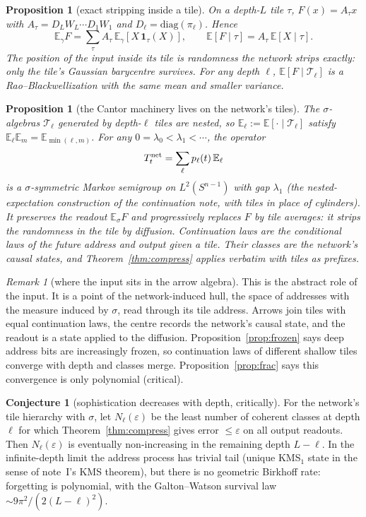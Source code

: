 \documentclass[11pt]{article}
\newtheorem{proposition}[theorem]{Proposition}
\theoremstyle{definition}
\newtheorem{conjecture}[theorem]{Conjecture}
\theoremstyle{remark}
\newtheorem{remark}[theorem]{Remark}
\newcommand{\E}{\mathbb E}
\begin{document}
\begin{proposition}[exact stripping inside a tile]\label{prop:tile}
On a depth-$L$ tile $\tau$, $F(x)=A_\tau x$ with $A_\tau=D_LW_L\cdots D_1W_1$ and $D_\ell=\mathrm{diag}(\pi_\ell)$. Hence
\[\E_\gamma F=\sum_\tau A_\tau\,\E_\gamma[X\,\mathbf 1_\tau(X)],\qquad \E[F\mid\tau]=A_\tau\,\E[X\mid\tau].\]
The position of the input inside its tile is randomness the network strips exactly: only the tile's Gaussian barycentre survives. For any depth $\ell$, $\E[F\mid\mathcal T_\ell]$ is a Rao--Blackwellization with the same mean and smaller variance.
\end{proposition}

\begin{proposition}[the Cantor machinery lives on the network's tiles]\label{prop:nettree}
The $\sigma$-algebras $\mathcal T_\ell$ generated by depth-$\ell$ tiles are nested, so $\E_\ell:=\E[\cdot\mid\mathcal T_\ell]$ satisfy $\E_\ell\E_m=\E_{\min(\ell,m)}$. For any $0=\lambda_0<\lambda_1<\cdots$, the operator
\[T^{\rm net}_t=\sum_\ell p_\ell(t)\,\E_\ell\]
is a $\sigma$-symmetric Markov semigroup on $L^2(S^{n-1})$ with gap $\lambda_1$ (the nested-expectation construction of the continuation note, with tiles in place of cylinders). It preserves the readout $\E_\sigma F$ and progressively replaces $F$ by tile averages: it strips the randomness in the tile by diffusion. Continuation laws are the conditional laws of the future address and output given a tile. Their classes are the network's causal states, and Theorem~\ref{thm:compress} applies verbatim with tiles as prefixes.
\end{proposition}

\begin{remark}[where the input sits in the arrow algebra]
This is the abstract role of the input. It is a point of the network-induced hull, the space of addresses with the measure induced by $\sigma$, read through its tile address. Arrows join tiles with equal continuation laws, the centre records the network's causal state, and the readout is a state applied to the diffusion. Proposition~\ref{prop:frozen} says deep address bits are increasingly frozen, so continuation laws of different shallow tiles converge with depth and classes merge. Proposition~\ref{prop:frac} says this convergence is only polynomial (critical).
\end{remark}

\begin{conjecture}[sophistication decreases with depth, critically]
For the network's tile hierarchy with $\sigma$, let $N_\ell(\varepsilon)$ be the least number of coherent classes at depth $\ell$ for which Theorem~\ref{thm:compress} gives error $\le\varepsilon$ on all output readouts. Then $N_\ell(\varepsilon)$ is eventually non-increasing in the remaining depth $L-\ell$. In the infinite-depth limit the address process has trivial tail (unique KMS$_1$ state in the sense of note~I's KMS theorem), but there is no geometric Birkhoff rate: forgetting is polynomial, with the Galton--Watson survival law $\sim9\pi^2/(2(L-\ell)^2)$.
\end{conjecture}
\end{document}
